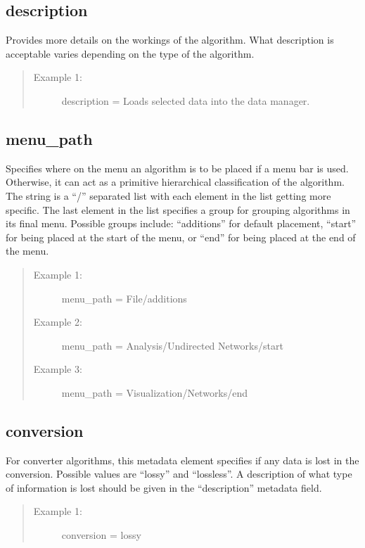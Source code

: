 \subsection*{description}
Provides more details on the workings of the algorithm. What
description is acceptable varies depending on the type of the algorithm.

\begin{quote}
\begin{description}
  \item[Example 1:] description = Loads selected data into the data manager. 
\end{description}
\end{quote}


\subsection*{menu\_path}
Specifies where on the menu an algorithm is to be
placed if a menu bar is used. Otherwise, it can act as a primitive hierarchical
classification of the algorithm. The string is a ``/'' separated list with
each element in the list getting more specific. The last element in the list
specifies a group for grouping algorithms in its final menu. Possible groups
include: ``additions'' for default placement, ``start'' for being placed at
the start of the menu, or ``end'' for being placed at the end of the menu.

\begin{quote}
\begin{description}
  \item[Example 1:] menu\_path = File/additions
  \item[Example 2:] menu\_path = Analysis/Undirected Networks/start
  \item[Example 3:] menu\_path = Visualization/Networks/end
\end{description}
\end{quote}


\subsection*{conversion}
For converter algorithms, this metadata element specifies if any data is
lost in the conversion. Possible values are ``lossy'' and ``lossless''. A
description of what type of information is lost should be given in the
``description'' metadata field.

\begin{quote}
\begin{description}
  \item[Example 1:] conversion = lossy 
\end{description}
\end{quote}


